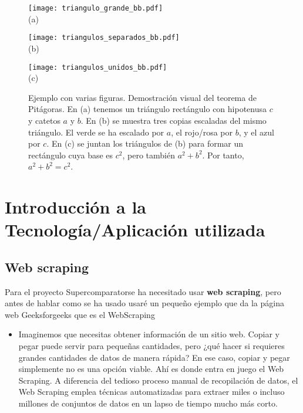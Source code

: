\documentclass[12pt,twoside,titlepage]{report}
\newcommand{\titulotrabajo}{Supercomparator}
\begin{document}
\begin{figure}
	\centering

	\begin{minipage}{0.45\textwidth}
		\centering

		\texttt{[image: triangulo\_grande\_bb.pdf]}\\

		\footnotesize (a)
	\end{minipage}
	\hfill
	\begin{minipage}{0.45\textwidth}
		\centering
		\texttt{[image: triangulos\_separados\_bb.pdf]}\\

		\footnotesize (b)
	\end{minipage}

	\bigskip

	\texttt{[image: triangulos\_unidos\_bb.pdf]}\\
	\footnotesize (c)

	\caption{Ejemplo con varias figuras. Demostración visual del teorema de Pitágoras. En (a) tenemos un triángulo rectángulo con hipotenusa $c$ y catetos $a$ y $b$. En (b) se muestra tres copias escaladas del mismo triángulo. El verde se ha escalado por $a$, el rojo/rosa por $b$, y el azul por $c$. En (c) se juntan los triángulos de (b) para formar un rectángulo cuya base es $c^{2}$, pero también $a^{2} + b^{2}$. Por tanto, $a^{2} + b^{2} = c^{2}$.}\label{fig:teoremapitagoras}
\end{figure}





\section{Introducción a la Tecnología/Aplicación utilizada}

\subsection{Web scraping}
\label{sec:WebScraping}

Para el proyecto \titulotrabajo \space se ha necesitado usar \textbf{web scraping}, pero antes de hablar como se ha usado usaré un pequeño ejemplo que da la página web Geeksforgeeks que es el WebScraping \cite{WebScraping}

\begin{itemize}
	\item Imaginemos que necesitas obtener información de un sitio web. Copiar y pegar puede servir para pequeñas cantidades, pero ¿qué hacer si requieres grandes cantidades de datos de manera rápida? En ese caso, copiar y pegar simplemente no es una opción viable. Ahí es donde entra en juego el Web Scraping. A diferencia del tedioso proceso manual de recopilación de datos, el Web Scraping emplea técnicas automatizadas para extraer miles o incluso millones de conjuntos de datos en un lapso de tiempo mucho más corto.
\end{itemize}
\end{document}
